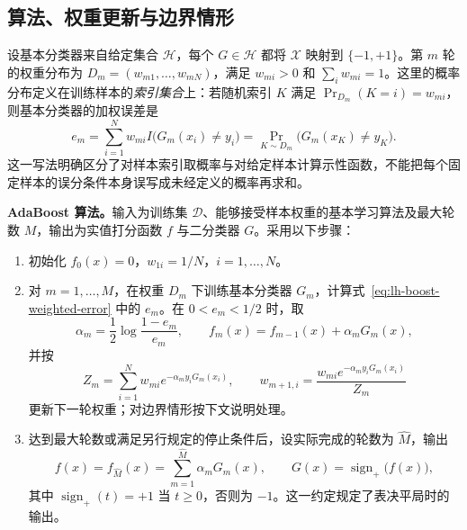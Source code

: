 \subsection{算法、权重更新与边界情形}
\label{subsec:lh-boost-algorithm}

设基本分类器来自给定集合 $\mathcal H$，每个 $G\in\mathcal H$ 都将 $\mathcal X$ 映射到 $\{-1,+1\}$。第 $m$ 轮的权重分布为 $D_m=(w_{m1},\ldots,w_{mN})$，满足 $w_{mi}>0$ 和 $\sum_iw_{mi}=1$。这里的概率分布定义在训练样本的\emph{索引集合}上：若随机索引 $K$ 满足 $\Pr_{D_m}(K=i)=w_{mi}$，则基本分类器的加权误差是
\begin{equation}
 e_m=\sum_{i=1}^{N}w_{mi}I\bigl(G_m(x_i)\ne y_i\bigr)
     =\Pr_{K\sim D_m}\bigl(G_m(x_K)\ne y_K\bigr).
 \label{eq:lh-boost-weighted-error}
\end{equation}
这一写法明确区分了对样本索引取概率与对给定样本计算示性函数，不能把每个固定样本的误分条件本身误写成未经定义的概率再求和。

\textbf{AdaBoost 算法。}输入为训练集 $\mathcal D$、能够接受样本权重的基本学习算法及最大轮数 $M$，输出为实值打分函数 $f$ 与二分类器 $G$。采用以下步骤：
\begin{enumerate}
 \item 初始化 $f_0(x)=0$，$w_{1i}=1/N$，$i=1,\ldots,N$。
 \item 对 $m=1,\ldots,M$，在权重 $D_m$ 下训练基本分类器 $G_m$，计算式~\eqref{eq:lh-boost-weighted-error} 中的 $e_m$。在 $0<e_m<1/2$ 时，取
 \begin{equation}
  \alpha_m=\frac12\log\frac{1-e_m}{e_m},\qquad
  f_m(x)=f_{m-1}(x)+\alpha_mG_m(x),
  \label{eq:lh-boost-alpha}
 \end{equation}
 并按
 \begin{equation}
  Z_m=\sum_{i=1}^{N}w_{mi}e^{-\alpha_my_iG_m(x_i)},\qquad
  w_{m+1,i}=\frac{w_{mi}e^{-\alpha_my_iG_m(x_i)}}{Z_m}
  \label{eq:lh-boost-weight-update}
 \end{equation}
 更新下一轮权重；对边界情形按下文说明处理。
 \item 达到最大轮数或满足另行规定的停止条件后，设实际完成的轮数为 $\widehat M$，输出
 \begin{equation}
  f(x)=f_{\widehat M}(x)=\sum_{m=1}^{\widehat M}\alpha_mG_m(x),\qquad
  G(x)=\operatorname{sign}_{+}\bigl(f(x)\bigr),
  \label{eq:lh-boost-final-classifier}
 \end{equation}
 其中 $\operatorname{sign}_{+}(t)=+1$ 当 $t\geq0$，否则为 $-1$。这一约定规定了表决平局时的输出。
\end{enumerate}

